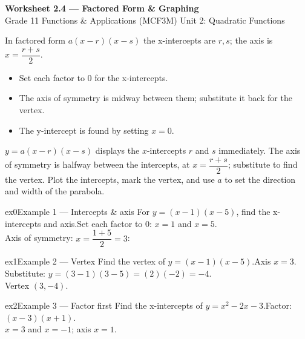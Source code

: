\documentclass[11pt]{article}
\begin{document}
\begin{center}
{\LARGE\bfseries\color{titleblue}Worksheet 2.4 --- Factored Form \& Graphing}\\[2pt]
{\small Grade 11 Functions \& Applications (MCF3M) \textperiodcentered{} Unit 2: Quadratic Functions}
\end{center}

\begin{ideabox}
In factored form $a(x-r)(x-s)$ the x-intercepts are $r,s$; the axis is $x=\dfrac{r+s}{2}$.
\begin{itemize}[leftmargin=*,itemsep=2pt]
  \item Set each factor to $0$ for the x-intercepts.
  \item The axis of symmetry is midway between them; substitute it back for the vertex.
  \item The y-intercept is found by setting $x=0$.
\end{itemize}
\end{ideabox}

\begin{learnbox}
$y=a(x-r)(x-s)$ displays the $x$-intercepts $r$ and $s$ immediately.
The axis of symmetry is halfway between the intercepts, at $x=\dfrac{r+s}{2}$; substitute to find the vertex.
Plot the intercepts, mark the vertex, and use $a$ to set the direction and width of the parabola.
\end{learnbox}


\begin{example}{ex0}{Example 1 --- Intercepts \& axis}
For $y=(x-1)(x-5)$, find the x-intercepts and axis.\soln Set each factor to $0$: $x=1$ and $x=5$. \\ Axis of symmetry: $x=\dfrac{1+5}{2}=3$:
\end{example}

\begin{example}{ex1}{Example 2 --- Vertex}
Find the vertex of $y=(x-1)(x-5)$.\soln Axis $x=3$. Substitute: $y=(3-1)(3-5)=(2)(-2)=-4$. \\ Vertex $(3,-4)$.
\end{example}

\begin{example}{ex2}{Example 3 --- Factor first}
Find the x-intercepts of $y=x^2-2x-3$.\soln Factor: $(x-3)(x+1)$. \\ $x=3$ and $x=-1$; axis $x=1$.
\end{example}
\end{document}
